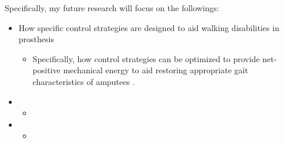 \documentclass[8pt]{article}
\begin{document}
Specifically, my future research will focus on the followings:

\begin{itemize}

    \item {How specific control strategies are designed to aid walking disabilities in prosthesis}
    \begin{itemize}
        \item {Specifically, how control strategies can be optimized to provide net-positive mechanical energy to aid restoring appropriate gait characteristics of amputees \cite{OSL2020}. }
    \end{itemize}
    \item {}
    \begin{itemize}
        \item {}
    \end{itemize}
    \item {}
    \begin{itemize}
        \item {}
    \end{itemize}

\end{itemize}



\end{document}
